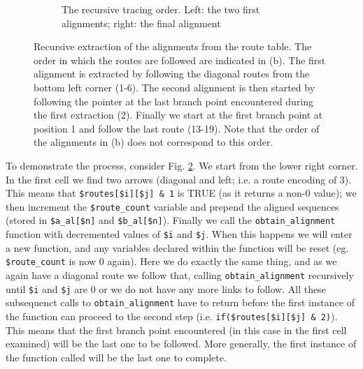 \documentclass[11pt]{article}
\begin{document}
\begin{figure}[ht]
\begin{subfigure}{0.5\textwidth}
  \caption{The recursive tracing order. Left: the two
  first alignments; right: the final alignment}
  \label{recurseOrder}
  \end{subfigure}
  \caption{Recursive extraction of the alignments from the route table. The order in
  which the routes are followed are indicated in (b). The first alignment
  is extracted by following the diagonal routes from the bottom left corner (1-6). The
  second alignment is then started by following the pointer at the last branch point
  encountered during the first extraction (2). Finally we start at the first branch point
  at position 1 and follow the last route (13-19). Note that the order of the alignments in (b)
  does not correspond to this order.}
  \label{alExtraction}
\end{figure}
To demonstrate the process, consider Fig. \ref{alExtraction}. We start from the lower
right corner. In the first cell we find two arrows (diagonal and left; i.e. a route
encoding of 3). This means that \verb|$routes[$i][$j] & 1| is TRUE (as it returns a non-0
value); we then increment the \verb|$route_count| variable and prepend the aligned sequences
(stored in \verb|$a_al[$n]| and \verb|$b_al[$n]|). Finally we call the \verb|obtain_alignment|
function with decremented values of \verb|$i| and \verb|$j|. When this happens we will
enter a new function, and any variables declared within the function will be reset (eg. \verb|$route_count|
is now 0 again). Here we do exactly the same thing, and as we again have a diagonal route
we follow that, calling \verb|obtain_alignment| recursively until \verb|$i| and \verb|$j| are 0 or
we do not have any more links to follow. All these subsequenct calls to \verb|obtain_alignment|
have to return before the first instance of the function can proceed to the second step (i.e. 
\verb|if($routes[$i][$j] & 2)|). This means that the first branch point encountered
(in this case in the first cell examined) will be the last one to be followed. More generally,
the first instance of the function called will be the last one to complete.
\end{document}
